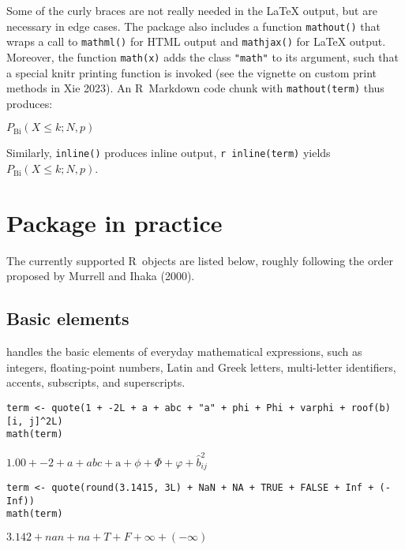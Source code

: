 Some of the curly braces are not really needed in the LaTeX output, but are
necessary in edge cases. The package also includes a function \texttt{mathout()} that
wraps a call to \texttt{mathml()} for HTML output and \texttt{mathjax()} for LaTeX output.
Moreover, the function \texttt{math(x)} adds the class \texttt{"math"} to its argument, such
that a special knitr printing function is
invoked (see the vignette on custom print methods in Xie 2023). An R~Markdown
code chunk with \texttt{mathout(term)} thus produces:

\({P}_{\mathrm{Bi}}{\left({{X}{\le}{k}}{{;}{{N}{{,}{p}}}}\right)}\)

Similarly, \texttt{inline()} produces inline
output, \texttt{\textasciigrave{}r\ inline(term)\textasciigrave{}} yields \({P}_{\mathrm{Bi}}{\left({{X}{\le}{k}}{{;}{{N}{{,}{p}}}}\right)}\).

\hypertarget{package-in-practice}{%
\section{\texorpdfstring{Package  in practice}{Package  in practice}}\label{package-in-practice}}

The currently supported R~objects are listed below, roughly following the order
proposed by Murrell and Ihaka (2000).

\hypertarget{basic-elements}{%
\subsection{Basic elements}\label{basic-elements}}

 handles the basic elements of everyday mathematical expressions,
such as integers, floating-point numbers, Latin and Greek letters, multi-letter
identifiers, accents, subscripts, and superscripts.

\begin{verbatim}
term <- quote(1 + -2L + a + abc + "a" + phi + Phi + varphi + roof(b)[i, j]^2L)
math(term)
\end{verbatim}

\({{{{{{{{1.00}{+}{{-}{2}}}{+}{a}}{+}{abc}}{+}{\mathrm{a}}}{+}{\phi}}{+}{\Phi}}{+}{\varphi}}{+}{{\hat{b}}_{{i}{{\mathrm{}}{j}}}^{2}}\)

\begin{verbatim}
term <- quote(round(3.1415, 3L) + NaN + NA + TRUE + FALSE + Inf + (-Inf))
math(term)
\end{verbatim}

\({{{{{{3.142}{+}{nan}}{+}{na}}{+}{T}}{+}{F}}{+}{\infty}}{+}{\left({-}{\infty}\right)}\)


